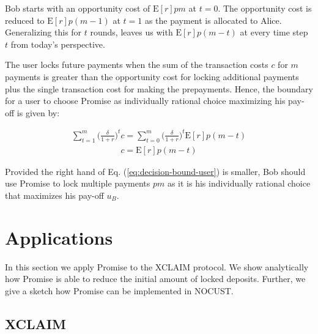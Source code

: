 \documentclass[runningheads]{llncs}
\newcommand{\sys}{Promise\xspace}
\newcommand{\aza}[1]{\todo[linecolor=blue,backgroundcolor=blue!25,bordercolor=blue,inline,caption={}]{Comment by Alexei: #1}}
\begin{document}
Bob starts with an opportunity cost of $\mathrm{E}[r]pm$ at $t=0$. 
The opportunity cost is reduced to $\mathrm{E}[r]p(m-1)$ at $t=1$ as the payment is allocated to Alice.
Generalizing this for $t$ rounds, leaves us with $\mathrm{E}[r]p(m-t)$ at every time step $t$ from today's perspective.

The user locks future payments when the sum of the transaction costs $c$ for $m$ payments is greater than the opportunity cost for locking additional payments plus the single transaction cost for making the prepayments.
Hence, the boundary for a user to choose \sys as individually rational choice maximizing his pay-off is given by:

\begin{align}
    \sum_{t=1}^m \big( \frac{\delta}{1+r} \big)^t c = \sum_{t=0}^m \big( \frac{\delta}{1+r} \big)^t \mathrm{E}[r]p(m-t)
\end{align}
\begin{align}
\label{eq:decision-bound-user}
c = \mathrm{E}[r]p(m-t)    
\end{align}

Provided the right hand of Eq. (\ref{eq:decision-bound-user}) is smaller, Bob should use \sys to lock multiple payments $pm$ as it is his individually rational choice that maximizes his pay-off $u_B$.









\section{Applications}
\label{sec:application}

In this section we apply \sys to the XCLAIM protocol.
We show analytically how \sys is able to reduce the initial amount of locked deposits.
Further, we give a sketch how \sys can be implemented in NOCUST.

\subsection{XCLAIM}
\end{document}
